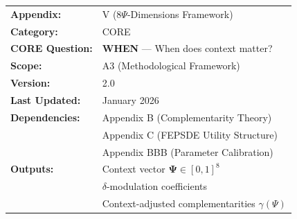 %
%
%


\begin{tcolorbox}[colback=green!5!white, colframe=green!75!black, 
    title=\textbf{CORE Appendix: Context Assessment}]

\begin{tabular}{@{}ll@{}}
\textbf{Appendix:} & V (8$\Psi$-Dimensions Framework) \\
\textbf{Category:} & CORE \\
\textbf{CORE Question:} & \textbf{WHEN} --- When does context matter? \\
\textbf{Scope:} & A3 (Methodological Framework) \\
\textbf{Version:} & 2.0 \\
\textbf{Last Updated:} & January 2026 \\
\textbf{Dependencies:} & Appendix B (Complementarity Theory) \\
 & Appendix C (FEPSDE Utility Structure) \\
 & Appendix BBB (Parameter Calibration) \\
\textbf{Outputs:} & Context vector $\boldsymbol{\Psi} \in [0,1]^8$ \\
 & $\delta$-modulation coefficients \\
 & Context-adjusted complementarities $\gamma(\Psi)$ \\
\end{tabular}

\end{tcolorbox}



